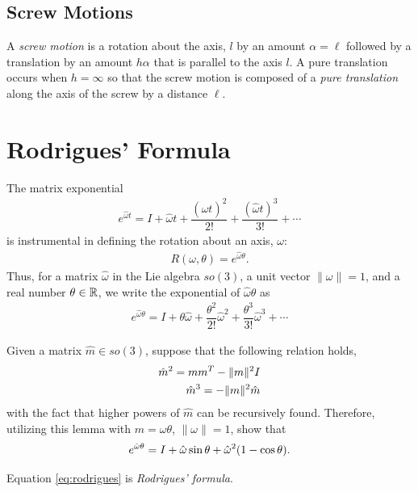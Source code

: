 \subsection{Screw Motions}

A \textit{screw motion} is a rotation about the axis, $l$ by an amount $\alpha = \ell$ followed by a translation by an amount $h\alpha$ that is parallel to the axis $l$. A pure translation occurs when $h=\infty$ so that the screw motion is composed of a \textit{pure translation} along the axis of the screw by a distance $\ell$. 



\section{Rodrigues' Formula}
%
The matrix exponential
%
\begin{align}
	e^{\hat{\omega}t} = I + \hat{\omega}t + \dfrac{(\hat{\omega}t)^2}{2!} + \dfrac{(\hat{\omega}t)^3}{3!} + \cdots
\end{align}
%
is instrumental in defining the rotation about an axis, $\omega$: 
%
\begin{align}
	R(\omega, \theta) = e^{\hat{\omega} \theta}.
\end{align}
%
Thus, for a matrix $\hat{\omega}$ in the Lie algebra ${so}(3)$, a unit vector $\|\omega\| = 1$, and a real number $\theta \in \mathbb{R}$, we write the exponential of $\hat{\omega} \theta$ as
%
\begin{align}
e^{\hat{\omega}\theta} = I + \theta \hat{\omega} + \dfrac{\theta^2}{2!}\hat{\omega}^2 + \dfrac{\theta^3}{3!}\hat{\omega}^3 + \cdots
\end{align}

\noindent 
\begin{homework}
	Given a matrix $\hat{m} \in so(3)$, suppose that the following relation holds,
	\begin{align}
	\hat{m}^2 = m m^T - \|m\|^2 I \\
	\hat{m}^3 = - \|m\|^2 \hat{m}
	\end{align}
	with the fact that higher powers of $\hat{m}$ can be recursively found. Therefore, utilizing this lemma with $m =\omega \theta$, $\|\omega\| = 1$, show that 
	\begin{align}
	e^{\hat{\omega}\theta}  = I + \hat{\omega} \sin \theta + \hat{\omega}^2(1 - \cos \theta).
	\label{eq:rodrigues}
	\end{align}
\end{homework} 
%
Equation \eqref{eq:rodrigues} is \textit{Rodrigues' formula}.


